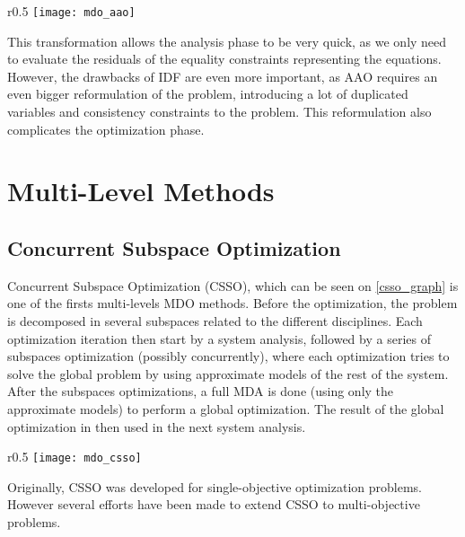 \begin{wrapfigure}{r}{0.5\textwidth}
\centering
\texttt{[image: mdo\_aao]}
\caption{AAO method}\label{aao_graph}
\end{wrapfigure}

This transformation allows the analysis phase to be very quick, as we only need to evaluate the residuals of the equality constraints representing the equations.
However, the drawbacks of IDF are even more important, as AAO requires an even bigger reformulation of the problem, introducing a lot of duplicated variables and consistency  constraints to the problem. This reformulation also complicates the optimization phase.



\section{Multi-Level Methods}

\subsection{Concurrent Subspace Optimization}

Concurrent Subspace Optimization (CSSO), which can be seen on \figurename{} \ref{csso_graph} is one of the firsts multi-levels MDO methods. Before the optimization, the problem is decomposed in several subspaces related to the different disciplines. Each optimization iteration then start by a system analysis, followed by a series of subspaces optimization (possibly concurrently), where each optimization tries to solve the global problem by using approximate models of the rest of the system. After the subspaces optimizations, a full MDA is done (using only the approximate models) to perform a global optimization. The result of the global optimization in then used in the next system analysis.

\begin{wrapfigure}{r}{0.5\textwidth}
\centering
\texttt{[image: mdo\_csso]}
\caption{CSSO method}\label{csso_graph}
\end{wrapfigure}

Originally, CSSO was developed for single-objective optimization problems. However several efforts have been made to extend CSSO to multi-objective problems.


